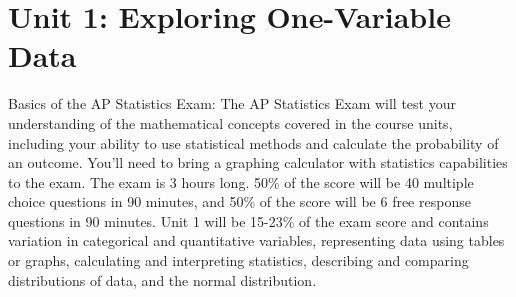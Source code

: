 \documentclass[../stats.tex]{subfiles}
\begin{document}
\chapter{Unit 1: Exploring One-Variable Data}
Basics of the AP Statistics Exam:
\smallbreak
The AP Statistics Exam will test your understanding of the mathematical concepts covered in the course units, including your ability to use statistical methods and calculate the probability of an outcome. You’ll need to bring a graphing calculator with statistics capabilities to the exam.
\smallbreak
The exam is 3 hours long. 50\% of the score will be 40 multiple choice questions in 90 minutes, and 50\% of the score will be 6 free response questions in 90 minutes.
\smallbreak
Unit 1 will be 15-23\% of the exam score and contains variation in categorical and quantitative variables, representing data using tables or graphs, calculating and interpreting statistics, describing and comparing distributions of data, and the normal distribution.
\end{document}
